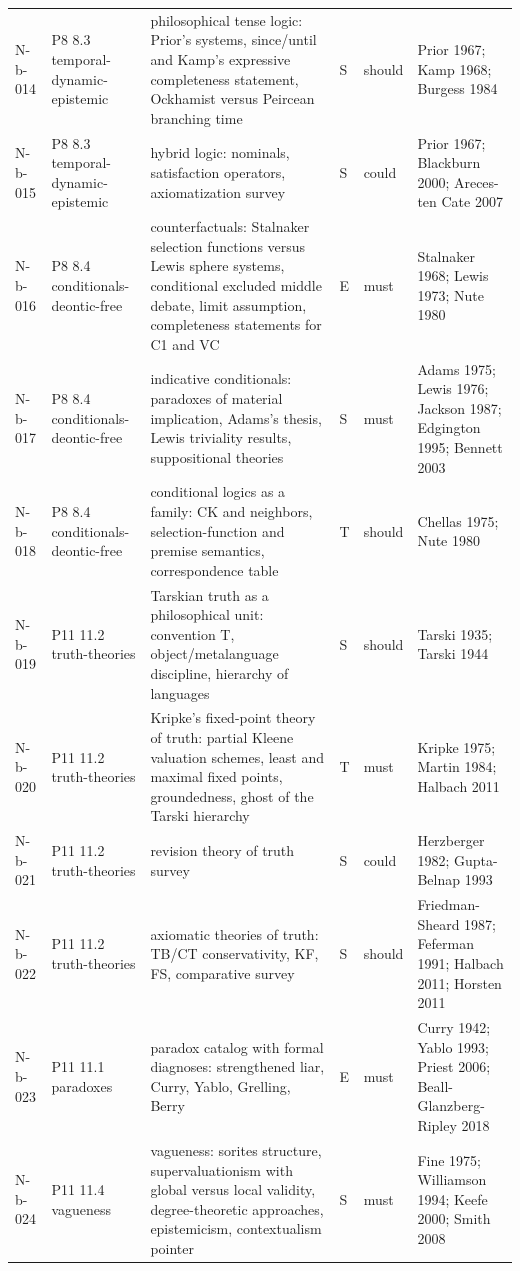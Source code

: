 \begin{longtable}{@{}p{0.52in}p{0.85in}p{2.5in}p{0.22in}p{0.42in}p{1.95in}@{}}
N-b-014 & P8 8.3 temporal-dynamic-epistemic & philosophical tense logic: Prior's systems, since/until and Kamp's expressive completeness statement, Ockhamist versus Peircean branching time & S & should & Prior 1967; Kamp 1968; Burgess 1984 \\
N-b-015 & P8 8.3 temporal-dynamic-epistemic & hybrid logic: nominals, satisfaction operators, axiomatization survey & S & could & Prior 1967; Blackburn 2000; Areces-ten Cate 2007 \\
N-b-016 & P8 8.4 conditionals-deontic-free & counterfactuals: Stalnaker selection functions versus Lewis sphere systems, conditional excluded middle debate, limit assumption, completeness statements for C1 and VC & E & must & Stalnaker 1968; Lewis 1973; Nute 1980 \\
N-b-017 & P8 8.4 conditionals-deontic-free & indicative conditionals: paradoxes of material implication, Adams's thesis, Lewis triviality results, suppositional theories & S & must & Adams 1975; Lewis 1976; Jackson 1987; Edgington 1995; Bennett 2003 \\
N-b-018 & P8 8.4 conditionals-deontic-free & conditional logics as a family: CK and neighbors, selection-function and premise semantics, correspondence table & T & should & Chellas 1975; Nute 1980 \\
N-b-019 & P11 11.2 truth-theories & Tarskian truth as a philosophical unit: convention T, object/metalanguage discipline, hierarchy of languages & S & should & Tarski 1935; Tarski 1944 \\
N-b-020 & P11 11.2 truth-theories & Kripke's fixed-point theory of truth: partial Kleene valuation schemes, least and maximal fixed points, groundedness, ghost of the Tarski hierarchy & T & must & Kripke 1975; Martin 1984; Halbach 2011 \\
N-b-021 & P11 11.2 truth-theories & revision theory of truth survey & S & could & Herzberger 1982; Gupta-Belnap 1993 \\
N-b-022 & P11 11.2 truth-theories & axiomatic theories of truth: TB/CT conservativity, KF, FS, comparative survey & S & should & Friedman-Sheard 1987; Feferman 1991; Halbach 2011; Horsten 2011 \\
N-b-023 & P11 11.1 paradoxes & paradox catalog with formal diagnoses: strengthened liar, Curry, Yablo, Grelling, Berry & E & must & Curry 1942; Yablo 1993; Priest 2006; Beall-Glanzberg-Ripley 2018 \\
N-b-024 & P11 11.4 vagueness & vagueness: sorites structure, supervaluationism with global versus local validity, degree-theoretic approaches, epistemicism, contextualism pointer & S & must & Fine 1975; Williamson 1994; Keefe 2000; Smith 2008 \\

\end{longtable}
